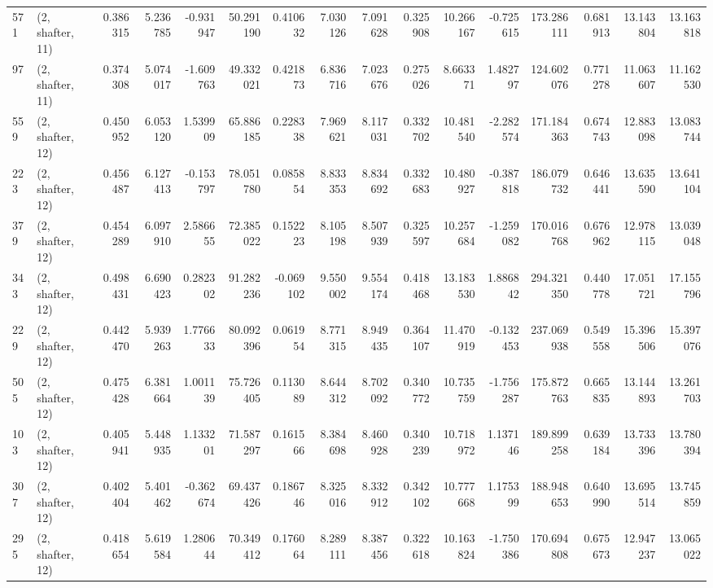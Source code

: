 \begin{tabular}{llrrrrrrrrrrrrrr}
571 &  (2, shafter, 11) &   0.386315 &   5.236785 &  -0.931947 &    50.291190 &   0.410632 &   7.030126 &   7.091628 &  0.325908 &  10.266167 &  -0.725615 &    173.286111 &   0.681913 &  13.143804 &   13.163818 \\
97  &  (2, shafter, 11) &   0.374308 &   5.074017 &  -1.609763 &    49.332021 &   0.421873 &   6.836716 &   7.023676 &  0.275026 &   8.663371 &   1.482797 &    124.602076 &   0.771278 &  11.063607 &   11.162530 \\
559 &  (2, shafter, 12) &   0.450952 &   6.053120 &   1.539909 &    65.886185 &   0.228338 &   7.969621 &   8.117031 &  0.332702 &  10.481540 &  -2.282574 &    171.184363 &   0.674743 &  12.883098 &   13.083744 \\
223 &  (2, shafter, 12) &   0.456487 &   6.127413 &  -0.153797 &    78.051780 &   0.085854 &   8.833353 &   8.834692 &  0.332683 &  10.480927 &  -0.387818 &    186.079732 &   0.646441 &  13.635590 &   13.641104 \\
379 &  (2, shafter, 12) &   0.454289 &   6.097910 &   2.586655 &    72.385022 &   0.152223 &   8.105198 &   8.507939 &  0.325597 &  10.257684 &  -1.259082 &    170.016768 &   0.676962 &  12.978115 &   13.039048 \\
343 &  (2, shafter, 12) &   0.498431 &   6.690423 &   0.282302 &    91.282236 &  -0.069102 &   9.550002 &   9.554174 &  0.418468 &  13.183530 &   1.886842 &    294.321350 &   0.440778 &  17.051721 &   17.155796 \\
229 &  (2, shafter, 12) &   0.442470 &   5.939263 &   1.776633 &    80.092396 &   0.061954 &   8.771315 &   8.949435 &  0.364107 &  11.470919 &  -0.132453 &    237.069938 &   0.549558 &  15.396506 &   15.397076 \\
505 &  (2, shafter, 12) &   0.475428 &   6.381664 &   1.001139 &    75.726405 &   0.113089 &   8.644312 &   8.702092 &  0.340772 &  10.735759 &  -1.756287 &    175.872763 &   0.665835 &  13.144893 &   13.261703 \\
103 &  (2, shafter, 12) &   0.405941 &   5.448935 &   1.133201 &    71.587297 &   0.161566 &   8.384698 &   8.460928 &  0.340239 &  10.718972 &   1.137146 &    189.899258 &   0.639184 &  13.733396 &   13.780394 \\
307 &  (2, shafter, 12) &   0.402404 &   5.401462 &  -0.362674 &    69.437426 &   0.186746 &   8.325016 &   8.332912 &  0.342102 &  10.777668 &   1.175399 &    188.948653 &   0.640990 &  13.695514 &   13.745859 \\
295 &  (2, shafter, 12) &   0.418654 &   5.619584 &   1.280644 &    70.349412 &   0.176064 &   8.289111 &   8.387456 &  0.322618 &  10.163824 &  -1.750386 &    170.694808 &   0.675673 &  12.947237 &   13.065022 \\

\end{tabular}
